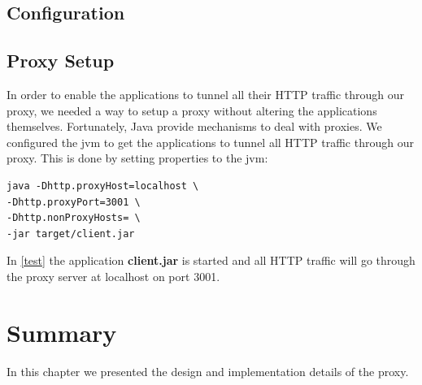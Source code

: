 \subsection{Configuration}




\subsection{Proxy Setup}

In order to enable the applications to tunnel all their HTTP traffic through our
proxy, we needed a way to setup a proxy without altering the applications
themselves. Fortunately, Java provide mechanisms to deal with
proxies\cite{oracle-proxy}. We configured the \gls{jvm} to get the applications
to tunnel all HTTP traffic through our proxy. This is done by setting properties
to the \gls{jvm}:


\begin{lstlisting}[frame=single, caption="Setting a proxy on the \gls{jvm}", label=test]
java -Dhttp.proxyHost=localhost \
-Dhttp.proxyPort=3001 \
-Dhttp.nonProxyHosts= \
-jar target/client.jar
\end{lstlisting}

In \cref{test} the application \textbf{client.jar} is started and all HTTP
traffic will go through the proxy server at localhost on port 3001.



\section{Summary}

In this chapter we presented the design and implementation details of the proxy.

